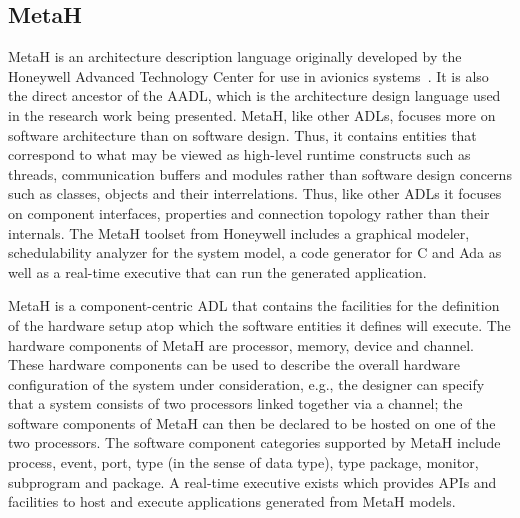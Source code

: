 \subsection{MetaH}
MetaH is an architecture description language originally developed by
the Honeywell Advanced Technology Center for use in avionics
systems~\cite{metah-manual}. It is also the direct ancestor of the
AADL, which is the architecture design language used in the research
work being presented. MetaH, like other ADLs, focuses more on software
architecture than on software design. Thus, it contains entities that
correspond to what may be viewed as high-level runtime constructs such
as threads, communication buffers and modules rather than software
design concerns such as classes, objects and their
interrelations. Thus, like other ADLs it focuses on component
interfaces, properties and connection topology rather than their
internals. The MetaH toolset from Honeywell includes a graphical
modeler, schedulability analyzer for the system model, a code
generator for C and Ada as well as a real-time executive that can run
the generated application.

MetaH is a component-centric ADL that contains the facilities for the
definition of the hardware setup atop which the software entities it
defines will execute. The hardware components of MetaH are processor,
memory, device and channel. These hardware components can be used to
describe the overall hardware configuration of the system under
consideration, e.g., the designer can specify that a system consists
of two processors linked together via a channel; the software
components of MetaH can then be declared to be hosted on one of the
two processors. The software component categories supported by MetaH
include process, event, port, type (in the sense of data type), type
package, monitor, subprogram and package. A real-time executive exists
which provides APIs and facilities to host and execute applications
generated from MetaH models.

